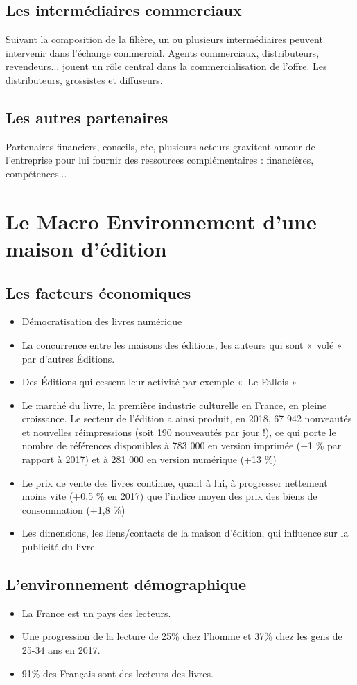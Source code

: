 \documentclass[a4paper, 13pt]{article}
\begin{document}
\subsection{Les intermédiaires commerciaux}
Suivant la composition de la filière, un ou plusieurs intermédiaires peuvent intervenir dans l'échange commercial. Agents commerciaux, distributeurs, revendeurs... jouent un rôle central dans la commercialisation de l'offre. Les distributeurs, grossistes et diffuseurs.
\subsection{Les autres partenaires}
Partenaires financiers, conseils, etc, plusieurs acteurs gravitent autour de l'entreprise pour lui fournir des ressources complémentaires : financières, compétences...

\section{Le Macro Environnement d’une maison d’édition}
\subsection{Les facteurs économiques}
\begin{itemize}
    \item Démocratisation des livres numérique
    \item La concurrence entre les maisons des éditions, les auteurs qui sont « volé » par d’autres Éditions.
    \item Des Éditions qui cessent leur activité par exemple « Le Fallois »
    \item Le marché du livre, la première industrie culturelle en France, en pleine croissance. Le secteur de l’édition a ainsi produit, en 2018, 67 942 nouveautés et nouvelles réimpressions (soit 190 nouveautés par jour !), ce qui porte le nombre de références disponibles à 783 000 en version imprimée (+1 \% par rapport à 2017) et à 281 000 en version numérique (+13 \%)
    \item Le prix de vente des livres continue, quant à lui, à progresser nettement moins vite (+0,5 \% en 2017) que l’indice moyen des prix des biens de consommation (+1,8 \%)
    \item Les dimensions, les liens/contacts de la maison d’édition, qui influence sur la publicité du livre.
\end{itemize}
 
\subsection{L'environnement démographique}
\begin{itemize}
    \item La France est un pays des lecteurs.
    \item Une progression de la lecture de 25\% chez l’homme et 37\% chez les gens de 25-34 ans en 2017.
    \item 91\% des Français sont des lecteurs des livres.
\end{itemize}
\end{document}
